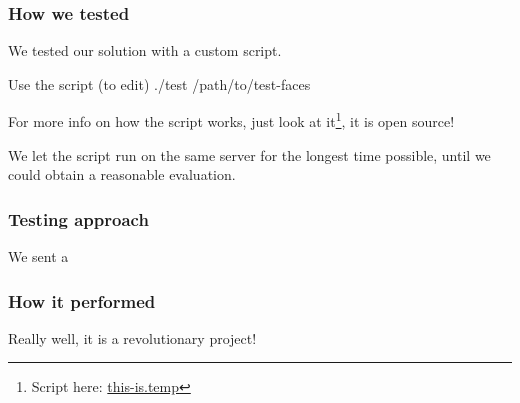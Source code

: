\begin{frame} \frametitle{How we tested}

	We tested our solution with a custom script.
	
	\vfill

	\begin{block}{Use the script (to edit)}
		./test /path/to/test-faces
	\end{block}
	
	For more info on how the script works, just look at 
	it\footnote{Script here: 
	{\color{red} \url{this-is.temp}}}, it is open source!

	\vfill
	
	We let the script run on the same server for the longest
	time possible, until we could obtain a reasonable evaluation.

\end{frame}

\begin{frame} \frametitle{Testing approach}

	We sent a 

\end{frame}

\begin{frame} \frametitle{How it performed}

	Really well, it is a revolutionary project!

\end{frame}
